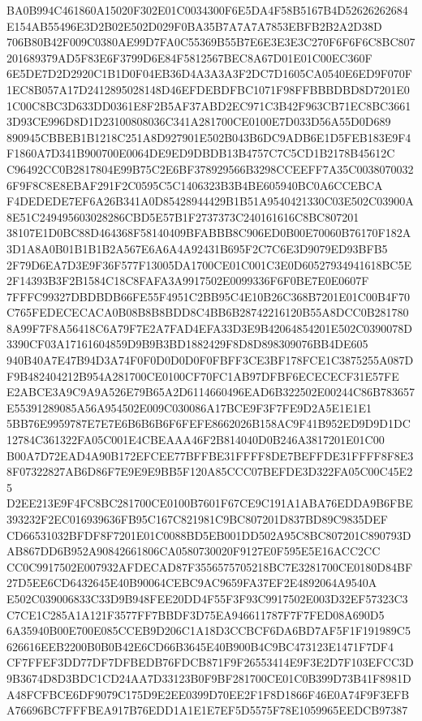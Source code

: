\documentclass[UTF8,fontset=fandol,zihao=-4,a4paper]{ctexart}
\begin{document}
{{BA0B994C461860A15020F302E01C0034300F6E5DA4F58B5167B4D52626262684E154AB55496E3D2B02E502D029F0BA35B7A7A7A7853EBFB2B2A2D38D
706B80B42F009C0380AE99D7FA0C55369B55B7E6E3E3E3C270F6F6F6C8BC807201689379AD5F83E6F3799D6E84F5812567BEC8A67D01E01C00EC360F
6E5DE7D2D2920C1B1D0F04EB36D4A3A3A3F2DC7D1605CA0540E6ED9F070F1EC8B057A17D2412895028148D46EFDEBDFBC1071F98FFBBBDBD8D7201E0
1C00C8BC3D633DD0361E8F2B5AF37ABD2EC971C3B42F963CB71EC8BC36613D93CE996D8D1D23100808036C341A281700CE0100E7D033D56A55D0D689
890945CBBEB1B1218C251A8D927901E502B043B6DC9ADB6E1D5FEB183E9F4F1860A7D341B900700E0064DE9ED9DBDB13B4757C7C5CD1B2178B45612C
C96492CC0B2817804E99B75C2E6BF378929566B3298CCEEFF7A35C00380700326F9F8C8E8EBAF291F2C0595C5C1406323B3B4BE605940BC0A6CCEBCA
F4DEDEDE7EF6A26B341A0D85428944429B1B51A9540421330C03E502C03900A8E51C249495603028286CBD5E57B1F2737373C240161616C8BC807201
38107E1D0BC88D464368F58140409BFABBB8C906ED0B00E70060B76170F182A3D1A8A0B01B1B1B2A567E6A6A4A92431B695F2C7C6E3D9079ED93BFB5
2F79D6EA7D3E9F36F577F13005DA1700CE01C001C3E0D60527934941618BC5E2F14393B3F2B1584C18C8FAFA3A9917502E0099336F6F0BE7E0E0607F
7FFFC99327DBDBDB66FE55F4951C2BB95C4E10B26C368B7201E01C00B4F70C765FEDECECACA0B08B8B8BDD8C4BB6B28742216120B55A8DCC0B281780
8A99F7F8A56418C6A79F7E2A7FAD4EFA33D3E9B42064854201E502C0390078D3390CF03A17161604859D9B9B3BD1882429F8D8D898309076BB4DE605
940B40A7E47B94D3A74F0F0D0D0D0F0FBFF3CE3BF178FCE1C3875255A087DF9B482404212B954A281700CE0100CF70FC1AB97DFBF6ECECECF31E57FE
E2ABCE3A9C9A9A526E79B65A2D6114660496EAD6B322502E00244C86B783657E55391289085A56A954502E009C030086A17BCE9F3F7FE9D2A5E1E1E1
5BB76E9959787E7E7E6B6B6B6F6FEFE8662026B158AC9F41B952ED9D9D1DC12784C361322FA05C001E4CBEAAA46F2B814040D0B246A3817201E01C00
B00A7D72EAD4A90B172EFCEE77BFFBE31FFFF8DE7BEFFDE31FFFF8F8E38F07322827AB6D86F7E9E9E9BB5F120A85CCC07BEFDE3D322FA05C00C45E25
D2EE213E9F4FC8BC281700CE0100B7601F67CE9C191A1ABA76EDDA9B6FBE393232F2EC016939636FB95C167C821981C9BC807201D837BD89C9835DEF
CD66531032BFDF8F7201E01C0088BD5EB001DD502A95C8BC807201C890793DAB867DD6B952A90842661806CA0580730020F9127E0F595E5E16ACC2CC
CC0C9917502E007932AFDECAD87F3556575705218BC7E3281700CE0180D84BF27D5EE6CD6432645E40B90064CEBC9AC9659FA37EF2E4892064A9540A
E502C039006833C33D9B948FEE20DD4F55F3F93C9917502E003D32EF57323C3C7CE1C285A1A121F3577FF7BBDF3D75EA946611787F7F7FED08A690D5
6A35940B00E700E085CCEB9D206C1A18D3CCBCF6DA6BD7AF5F1F191989C5626616EEB2200B0B0B42E6CD66B3645E40B900B4C9BC473123E1471F7DF4
CF7FFEF3DD77DF7DFBEDB76FDCB871F9F26553414E9F3E2D7F103EFCC3D9B3674D8D3BDC1CD24AA7D33123B0F9BF281700CE01C0B399D73B41F8981D
A48FCFBCE6DF9079C175D9E2EE0399D70EE2F1F8D1866F46E0A74F9F3EFBA76696BC7FFFBEA917B76EDD1A1E1E7EF5D5575F78E1059965EEDCB97387
}}
\end{document}
